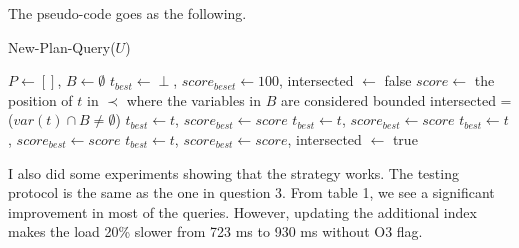 \documentclass{article}
\begin{document}
\begin{enumerate}
\begin{enumerate}
The pseudo-code goes as the following. 

\begin{algorithm}[H]
\caption{New-Plan-Query($U$)}\label{alg:greedy}
\begin{algorithmic}

\State $P \leftarrow []$, $B\leftarrow \emptyset$
\State $t_{best}\leftarrow \perp$, $score_{beset} \leftarrow 100$, intersected $\leftarrow$ false
\State $score \leftarrow$ the position of $t$ in $\prec$ where the variables in $B$ are considered bounded
\State intersected = ($var(t) \cap B \neq \emptyset$)
\State $t_{best} \leftarrow t$, $score_{best} \leftarrow score$
\EndIf
{}
\State $t_{best} \leftarrow t$, $score_{best} \leftarrow score$
\EndIf
\EndIf
{}
\State $t_{best} \leftarrow t$, $score_{best} \leftarrow score$
\EndIf
\Else
{} 
\State $t_{best} \leftarrow t$, $score_{best} \leftarrow score$, intersected $\leftarrow$ true
\EndIf
\EndIf

\EndFor
\EndWhile

\end{algorithmic}
\end{algorithm}


I also did some experiments showing that the strategy works. The testing protocol is the same as the one in question 3. From table 1, we see a significant improvement in most of the queries. However, updating the additional index makes the load 20\% slower from 723 ms to 930 ms without O3 flag.


\end{enumerate}
\end{enumerate}
\end{document}
